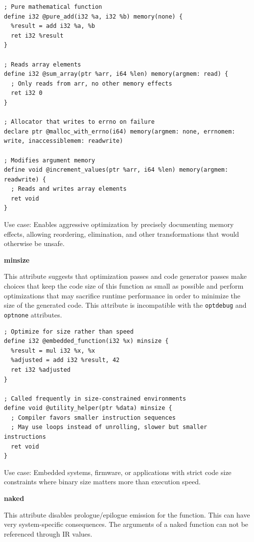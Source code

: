 \begin{lstlisting}[style=ir]
; Pure mathematical function
define i32 @pure_add(i32 %a, i32 %b) memory(none) {
  %result = add i32 %a, %b
  ret i32 %result
}

; Reads array elements
define i32 @sum_array(ptr %arr, i64 %len) memory(argmem: read) {
  ; Only reads from arr, no other memory effects
  ret i32 0
}

; Allocator that writes to errno on failure
declare ptr @malloc_with_errno(i64) memory(argmem: none, errnomem: write, inaccessiblemem: readwrite)

; Modifies argument memory
define void @increment_values(ptr %arr, i64 %len) memory(argmem: readwrite) {
  ; Reads and writes array elements
  ret void
}
\end{lstlisting}

Use case: Enables aggressive optimization by precisely documenting memory effects, allowing reordering, elimination, and other transformations that would otherwise be unsafe.

\textbf{minsize}

This attribute suggests that optimization passes and code generator passes make choices that keep the code size of this function as small as possible and perform optimizations that may sacrifice runtime performance in order to minimize the size of the generated code.
This attribute is incompatible with the \texttt{optdebug} and \texttt{optnone} attributes.

\begin{lstlisting}[style=ir]
; Optimize for size rather than speed
define i32 @embedded_function(i32 %x) minsize {
  %result = mul i32 %x, %x
  %adjusted = add i32 %result, 42
  ret i32 %adjusted
}

; Called frequently in size-constrained environments
define void @utility_helper(ptr %data) minsize {
  ; Compiler favors smaller instruction sequences
  ; May use loops instead of unrolling, slower but smaller instructions
  ret void
}
\end{lstlisting}

Use case: Embedded systems, firmware, or applications with strict code size constraints where binary size matters more than execution speed.

\textbf{naked}

This attribute disables prologue/epilogue emission for the function.
This can have very system-specific consequences.
The arguments of a naked function can not be referenced through IR values.

